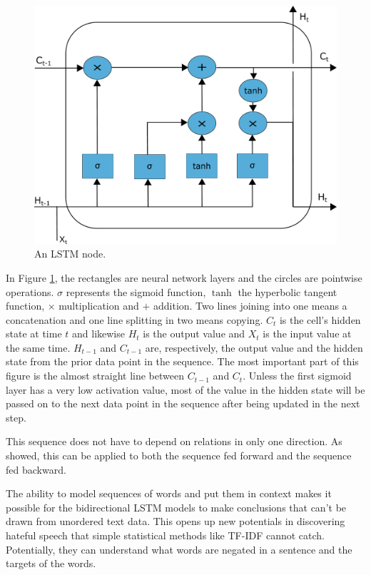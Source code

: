 \documentclass[nofilelist]{cslthse-msc}
\begin{document}
\begin{figure}[ht]
    \centering
    \includegraphics[width=\textwidth]{LSTMnode.pdf}
    \caption{An LSTM node.}
    \label{fig:LSTMnode}
\end{figure}

In Figure \ref{fig:LSTMnode}, the rectangles are neural network layers and the circles are pointwise operations.  $\sigma$ represents the sigmoid function, $\tanh$ the hyperbolic tangent function, $\times$ multiplication and $+$ addition. Two lines joining into one means a concatenation and one line splitting in two means copying. $C_t$ is the cell's hidden state at time $t$ and likewise $H_t$ is the output value and $X_t$ is the input value at the same time. $H_{t-1}$ and $C_{t-1}$ are, respectively, the output value and the hidden state from the prior data point in the sequence. The most important part of this figure is the almost straight line between $C_{t-1}$ and $C_{t}$. Unless the first sigmoid layer has a very low activation value, most of the value in the hidden state will be passed on to the next data point in the sequence after being updated in the next step.

This sequence does not have to depend on relations in only one direction. As \citet{graves2005framewise} showed, this can be applied to both the sequence fed forward and the sequence fed backward. 

The ability to model sequences of words and put them in context makes it possible for the bidirectional LSTM models to make conclusions that can't be drawn from unordered text data. This opens up new potentials in discovering hateful speech that simple statistical methods like TF-IDF cannot catch. Potentially, they can understand what words are negated in a sentence and the targets of the words.
\end{document}
